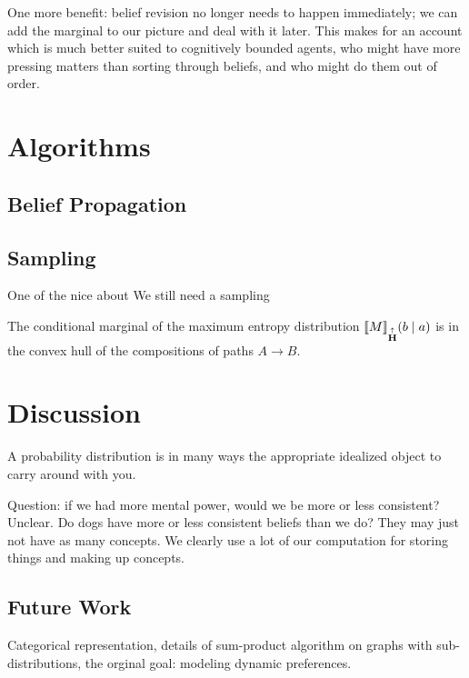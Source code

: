 \documentclass{article}
\newcommand\MaxEnt{{\overset{\uparrow}{\mathbf H}}}
\begin{document}
	
	One more benefit: belief revision no longer needs to happen immediately; we can add the marginal to our picture and deal with it later. This makes for an account which is much better suited to cognitively bounded agents, who might have more pressing matters than sorting through beliefs, and who might do them out of order.

	\section{Algorithms}\label{sec:algorithms}
	\subsection{Belief Propagation}
	
	\subsection{Sampling}
	
	One of the nice  about 
	We still need a sampling 
	
	\begin{conj}
		The conditional marginal of the maximum entropy distribution $\bbr{M}_\MaxEnt(b \mid a)$ is in the convex hull of the compositions of paths $A \to B$. 
	\end{conj}
	





	\section{Discussion}
	
	
	A probability distribution is in many ways the appropriate idealized object to carry around with you.
	
	Question: if we had more mental power, would we be more or less consistent? Unclear. Do dogs have more or less consistent beliefs than we do? They may just not have as many concepts. We clearly use a lot of our computation for storing things and making up concepts.
	
	
	\subsection{Future Work}
	Categorical representation, details of sum-product algorithm on graphs with sub-distributions, the orginal goal: modeling dynamic preferences.
	
\end{document}
